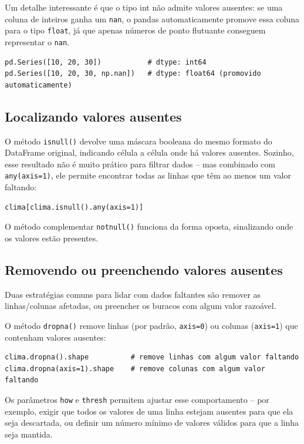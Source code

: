 \documentclass[11pt,a4paper]{article}
\begin{document}
Um detalhe interessante é que o tipo int não admite valores ausentes: se uma coluna de inteiros ganha um \texttt{nan}, o pandas automaticamente promove essa coluna para o tipo \texttt{float}, já que apenas números de ponto flutuante conseguem representar o \texttt{nan}.

\begin{lstlisting}
pd.Series([10, 20, 30])           # dtype: int64
pd.Series([10, 20, 30, np.nan])   # dtype: float64 (promovido automaticamente)
\end{lstlisting}

\subsection{Localizando valores ausentes}

O método \texttt{isnull()} devolve uma máscara booleana do mesmo formato do DataFrame original, indicando célula a célula onde há valores ausentes. Sozinho, esse resultado não é muito prático para filtrar dados -- mas combinado com \texttt{any(axis=1)}, ele permite encontrar todas as linhas que têm ao menos um valor faltando:
\begin{lstlisting}
clima[clima.isnull().any(axis=1)]
\end{lstlisting}

O método complementar \texttt{notnull()} funciona da forma oposta, sinalizando onde os valores estão presentes.

\subsection{Removendo ou preenchendo valores ausentes}

Duas estratégias comuns para lidar com dados faltantes são remover as linhas/colunas afetadas, ou preencher os buracos com algum valor razoável.

O método \texttt{dropna()} remove linhas (por padrão, \texttt{axis=0}) ou colunas (\texttt{axis=1}) que contenham valores ausentes:
\begin{lstlisting}
clima.dropna().shape          # remove linhas com algum valor faltando
clima.dropna(axis=1).shape    # remove colunas com algum valor faltando
\end{lstlisting}

Os parâmetros \texttt{how} e \texttt{thresh} permitem ajustar esse comportamento -- por exemplo, exigir que todos os valores de uma linha estejam ausentes para que ela seja descartada, ou definir um número mínimo de valores válidos para que a linha seja mantida.
\end{document}
